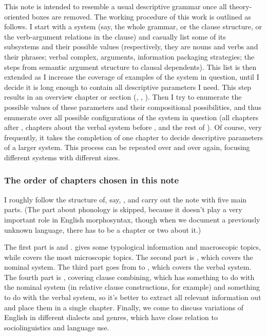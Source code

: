 \documentclass[UTF8, a4paper, oneside, scheme=plain]{ctexrep}
\begin{document}
This note is intended to resemble a usual descriptive grammar 
once all theory-oriented boxes are removed.
The working procedure of this work is outlined as follows.
I start with a system (say, the whole grammar, 
or the clause structure,
or the verb-argument relations in the clause)
and casually list some of its subsystems and their possible values
(respectively, they are nouns and verbs and their phrases; 
verbal complex, arguments, information packaging strategies;
the steps from semantic argument structure to clausal dependents).
This list is then extended as I increase the coverage of examples of the system in question,
until I decide it is long enough to contain all descriptive parameters I need.
This step results in an overview chapter or section
(, , ).
Then I try to enumerate the possible values of these parameters 
and their compositional possibilities,
and thus enumerate over all possible configurations of the system in question
(all chapters after , 
chapters about the verbal system before ,
and the rest of ).
Of course, very frequently, it takes the completion of one chapter 
to decide descriptive parameters of a larger system.
This process can be repeated over and over again,
focusing different systems with different sizes.

\subsubsection{The order of chapters chosen in this note}

I roughly follow the structure of, say, \citet{Friesen2017},
and carry out the note with five main parts.
(The part about phonology is skipped,
because it doesn't play a very important role in English morphosyntax,
though when we document a previously unknown language,
there has to be a chapter or two about it.)

The first part is  and .
 gives some typological information and macroscopic topics,
while  covers the most microscopic topics.
The second part is , %
which covers the nominal system.
The third part goes from  to ,
which covers the verbal system.
The fourth part is ,
covering clause combining,
which has something to do with the nominal system 
(in relative clause constructions, for example)
and something to do with the verbal system,
so it's better to extract all relevant information out 
and place them in a single chapter.
Finally, we come to discuss variations of English
in different dialects and genres, 
which have close relation to sociolinguistics and language use.
\end{document}
